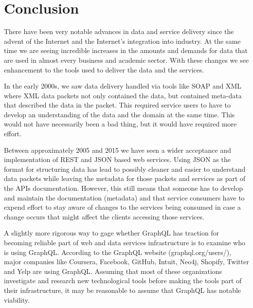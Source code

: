 \section{Conclusion}
There have been very notable advances in data and service delivery since the 
advent of the Internet and the Internet's integration into industry.  At the 
same time we are seeing incredible increases in the amounts and demands for 
data that are used in almost every business and academic sector.  With these 
changes we see enhancement to the tools used to deliver the data and the 
services.  

In the early 2000s, we saw data delivery handled via tools like SOAP and XML 
where XML data packets not only contained the data, but contained meta-data 
that described the data in the packet.  This required service users to have to 
develop an understanding of the data and the domain at the same time.  This 
would not have necessarily been a bad thing, but it would have required more 
effort.

Between approximately 2005 and 2015 we have seen a wider acceptance and 
implementation of REST and JSON based web services.  Using JSON as the format 
for structuring data has lead to possibly cleaner and easier to understand 
data packets while leaving the metadata for those packets and services as part 
of the APIs documentation.  However, this still means that someone has to 
develop and maintain the documentation (metadata) and that service consumers 
have to expend effort to stay aware of changes to the services being consumed 
in case a change occurs that might affect the clients accessing those services.

A slightly more rigorous way to gage whether GraphQL has traction for becoming 
reliable part of web and data services infrastructure is to examine who is 
using GraphQL.  According to the GraphQL website (graphql.org/users/), major 
companies like Coursera, Facebook, GitHub, Intuit, Neo4j, Shopify, Twitter 
and Yelp are using GraphQL\cite{hid505GraphQLUsers2018}.  Assuming that most of these 
organizations investigate and research new technological tools before making 
the tools part of their infrastructure, it may be reasonable to assume that 
GraphQL has notable viability.

